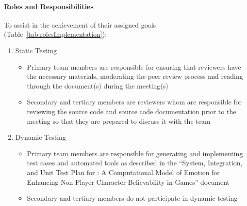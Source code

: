 %
%
%
%
%
%
%
%

\paragraph{Roles and Responsibilities} To assist in the achievement of their
assigned goals (Table~\ref{tab:rolesImplementation}):
\begin{enumerate}

    \item Static Testing
    \begin{itemize}

        \item Primary team members are responsible for ensuring that reviewers
        have the necessary materials, moderating the peer review process and
        reading through the document(s) during the meeting(s)

        \item Secondary and tertiary members are reviewers whom are responsible
        for reviewing the source code and source code documentation prior to
        the meeting so that they are prepared to discuss it with the team

    \end{itemize}

    \item Dynamic Testing
    \begin{itemize}

        \item Primary team members are responsible for generating and
        implementing test cases and automated tools as described in the
        ``System, Integration, and Unit Test Plan for \progname{}: A
        Computational Model of Emotion for Enhancing Non-Player Character
        Believability in Games'' document

        \item Secondary and tertiary members do not participate in dynamic
        testing

    \end{itemize}

\end{enumerate}

